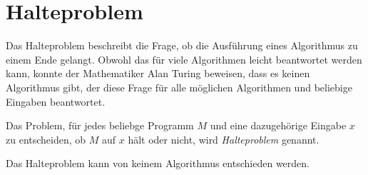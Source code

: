 






\section{Halteproblem}
Das Halteproblem beschreibt die Frage, ob die Ausführung eines Algorithmus zu einem Ende gelangt. Obwohl das für viele Algorithmen leicht beantwortet werden kann, konnte der Mathematiker Alan Turing beweisen, dass es keinen Algorithmus gibt, der diese Frage für alle möglichen Algorithmen und beliebige Eingaben beantwortet.

\begin{mydefinition}[Halteproblem]\label{mydefinition:halteproblem}
Das Problem, für jedes beliebge Programm $M$ und eine dazugehörige Eingabe $x$ zu entscheiden, ob $M$ auf $x$ hält oder nicht, wird \emph{Halteproblem} genannt.
\end{mydefinition}

\begin{mytheorem}[Halteproblem]
Das Halteproblem kann von keinem Algorithmus entschieden werden.
\end{mytheorem}

